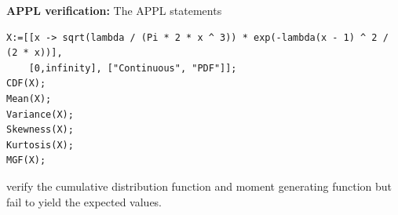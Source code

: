 \documentclass[12pt,fullpage]{article}
\begin{document}
\vspace{0.1in}

\newpage
\noindent
{\bf APPL verification:}
The APPL statements
\begin{verbatim}
X:=[[x -> sqrt(lambda / (Pi * 2 * x ^ 3)) * exp(-lambda(x - 1) ^ 2 / (2 * x))], 
    [0,infinity], ["Continuous", "PDF"]];
CDF(X);
Mean(X);
Variance(X);
Skewness(X);
Kurtosis(X);
MGF(X);
\end{verbatim}
verify the cumulative distribution function and moment generating function but fail to yield the expected values.
\end{document}
